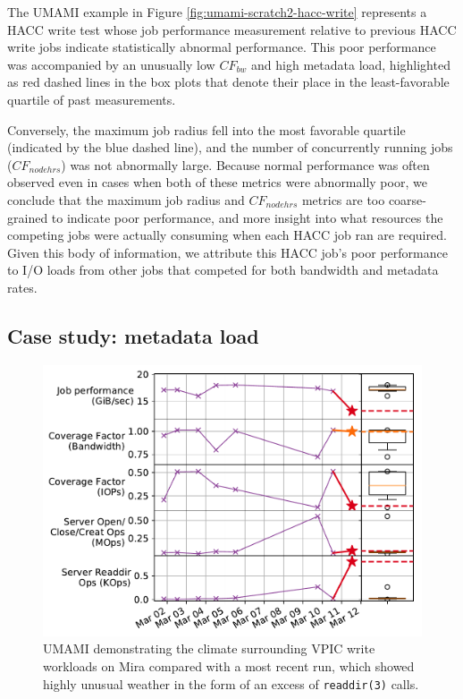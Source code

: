 {The UMAMI example in Figure \ref{fig:umami-scratch2-hacc-write} represents a HACC write test whose job performance measurement relative to previous HACC write jobs indicate statistically abnormal performance.
This poor performance was accompanied by an unusually low $\mathit{CF}_{\mathit{bw}}$ and high metadata load, highlighted as red dashed lines in the box plots that denote their place in the least-favorable quartile of past measurements.

Conversely, the maximum job radius fell into the most favorable quartile (indicated by the blue dashed line),
and the number of concurrently running jobs ($\mathit{CF}_{\mathit{nodehrs}}$) was not abnormally large.
Because normal performance was often observed even in cases when both of these metrics were abnormally poor, we conclude that the maximum job radius and $\mathit{CF}_{\mathit{nodehrs}}$ metrics are too coarse-grained to indicate poor performance, and
more insight into what resources the competing jobs were actually consuming when each HACC job ran are required.
Given this body of information, we attribute this HACC job's poor performance to I/O loads from other jobs that competed for both bandwidth and metadata rates.

\subsection{Case study: metadata load}

\begin{figure}[t]
    \centering
    \includegraphics[width=1.0\columnwidth]{figs/umami-mira-fs1-vpic-write.pdf}
    \vspace{-.25in}
    \caption{UMAMI demonstrating the climate surrounding VPIC write workloads on Mira compared with a most recent run, which showed highly unusual weather in the form of an excess of \texttt{readdir(3)} calls.
    }
    \label{fig:umami-mira-fs1-vpic-write}
	\vspace{-.15in}
\end{figure}

}
